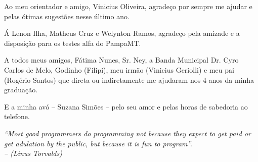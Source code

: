 \documentclass[12pt,twoside,oneright,a4paper,chapter=TITLE,english,brazil]{unipampa}
\begin{document}
\begin{agradecimentos}
    \SingleSpacing
    \OnehalfSpacing

    \noindent Ao meu orientador e amigo, Vinicius Oliveira, agradeço por sempre me ajudar e pelas ótimas sugestões nesse último ano.
    
    \SingleSpacing
    \OnehalfSpacing
    
    \noindent Á Lenon Ilha, Matheus Cruz e Welynton Ramos, agradeço pela amizade e a disposição para os testes alfa do PampaMT.
    
    \SingleSpacing
    \OnehalfSpacing
    
    \noindent A todos meus amigos, Fátima Nunes, Sr. Ney, a Banda Municipal Dr. Cyro Carlos de Melo, Godinho (Filipi), meu irmão (Vinicius Geriolli) e meu pai (Rogério Santos) que direta ou indiretamente me ajudaram nos 4 anos da minha graduação. 
   
    \SingleSpacing
    \OnehalfSpacing
   
    \noindent E a minha avó -- Suzana Simões -- pelo seu amor e pelas horas de sabedoria ao telefone.
    
\end{agradecimentos}


\begin{epigrafe}
    \textit{``Most good programmers do programming not because they expect to get paid or get adulation by the public, but because it is fun to program''.
    \DoubleSpacing \\
    -- (Linus Torvalds)}
\end{epigrafe}
\end{document}
